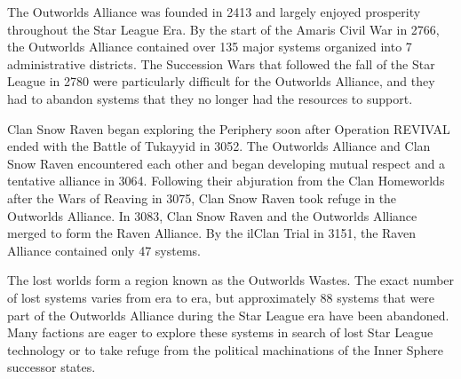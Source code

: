 The Outworlds Alliance was founded in 2413 and largely enjoyed prosperity throughout the Star League Era.
By the start of the Amaris Civil War in 2766, the Outworlds Alliance contained over 135 major systems organized into 7 administrative districts.
The Succession Wars that followed the fall of the Star League in 2780 were particularly difficult for the Outworlds Alliance, and they had to abandon systems that they no longer had the resources to support.

Clan Snow Raven began exploring the Periphery soon after Operation REVIVAL ended with the Battle of Tukayyid in 3052.
The Outworlds Alliance  and Clan Snow Raven encountered each other and began developing mutual respect and a tentative alliance in 3064.
Following their abjuration from the Clan Homeworlds after the Wars of Reaving in 3075, Clan Snow Raven took refuge in the Outworlds Alliance.
In 3083, Clan Snow Raven and the Outworlds Alliance merged to form the Raven Alliance.
By the ilClan Trial in 3151, the Raven Alliance contained only 47 systems.

The lost worlds form a region known as the Outworlds Wastes.
The exact number of lost systems varies from era to era, but approximately 88 systems that were part of the Outworlds Alliance during the Star League era have been abandoned.
Many factions are eager to explore these systems in search of lost Star League technology or to take refuge from the political machinations of the Inner Sphere successor states.
